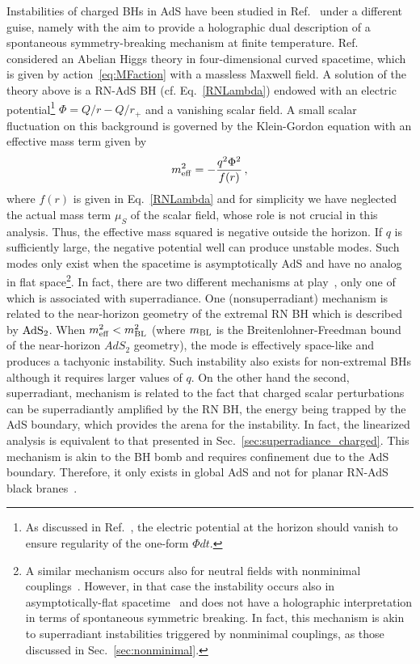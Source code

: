 \documentclass[11pt]{article}
\numberwithin{equation}{section} %
\begin{document}
Instabilities of charged BHs in AdS have been studied in Ref.~\cite{Gubser:2008px} under a different guise, namely with the aim to provide a holographic dual description of a spontaneous symmetry-breaking mechanism at finite temperature. Ref.~\cite{Gubser:2008px} considered an Abelian Higgs theory in four-dimensional curved spacetime, which is given by action~\eqref{eq:MFaction} with a massless Maxwell field.
A solution of the theory above is a RN-AdS BH (cf. Eq.~\eqref{RNLambda}) endowed with an electric potential\footnote{As discussed in Ref.~\cite{Gubser:2008px}, the electric potential at the horizon should vanish to ensure regularity of the one-form $\Phi dt$.} $\Phi=Q/r-Q/r_+$ and a vanishing scalar field. A small scalar fluctuation on this background is governed by the Klein-Gordon equation with an effective mass term given by
%
\begin{equation}
 m^2_{\rm eff}=-\frac{q^2\Phi^2}{f(r)}\,, 
\end{equation}
%
where $f(r)$ is given in Eq.~\eqref{RNLambda} and for simplicity we have neglected the actual mass term $\mu_S$ of the scalar field, whose role is not crucial in this analysis. Thus, the effective mass squared is negative outside the horizon. If $q$ is sufficiently large, the negative potential well can produce unstable modes. 
Such modes only exist when the spacetime is asymptotically AdS and have no analog in flat space\footnote{A similar mechanism occurs also for neutral fields with nonminimal couplings~\cite{Cadoni:2009xm}. However, in that case the instability occurs also in asymptotically-flat spacetime~\cite{Gubser:2005ih} and does not have a holographic interpretation in terms of spontaneous symmetric breaking. In fact, this mechanism is akin to superradiant instabilities triggered by nonminimal couplings, as those discussed in Sec.~\ref{sec:nonminimal}.}. 
%
In fact, there are two different mechanisms at play~\cite{Dias:2010ma,Dias:2011tj,Dias:2016pma,Dias:2018zjg}, only one of which is associated with superradiance. 
One (nonsuperradiant) mechanism is related to the near-horizon geometry of the extremal RN BH which is described by 
${\rm AdS}_2$. When $m^2_{\rm eff}<m_{\rm BL}^2$ (where $m_{\rm BL}$ is the Breitenlohner-Freedman bound of the 
near-horizon $AdS_2$ geometry), the mode is effectively space-like and produces a tachyonic instability. Such 
instability also exists for non-extremal BHs although it requires larger values of $q$. On the other hand the second, 
superradiant, mechanism is related to the fact that charged scalar perturbations can be superradiantly amplified by the 
RN BH, the energy being trapped by the AdS boundary, which provides the arena for the instability. In fact, the 
linearized analysis is equivalent to that presented in Sec.~\ref{sec:superradiance_charged}. This mechanism is akin to 
the BH bomb and requires confinement due to the AdS boundary. Therefore, it only exists in global AdS and not for planar 
RN-AdS black branes~\cite{Basu:2010uz,Dias:2011tj}.
%
\end{document}
